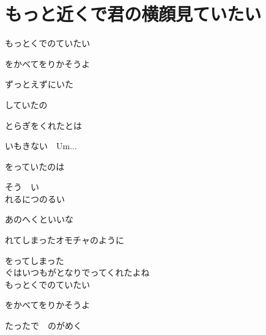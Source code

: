 \section{ もっと近くで君の横顔見ていたい}


\large{

もっとくでのていたい

をかべてをりかそうよ

ずっとえずにいた　

していたの

とらぎをくれたとは

いもきない　Um...　

をっていたのは

そう　い
\\

れるにつのるい

あのへくといいな

れてしまったオモチャのように

をってしまった
\\

ぐはいつもがとなりでってくれたよね
\\

もっとくでのていたい

をかべてをりかそうよ

たったで　のがめく

}
